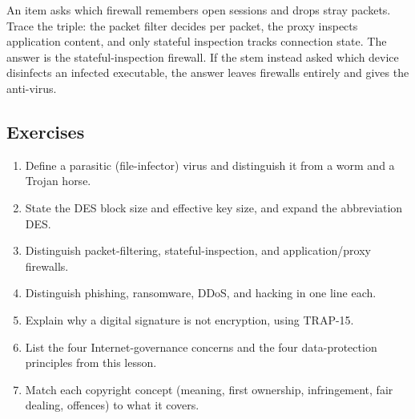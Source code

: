 \begin{example}
An item asks which firewall remembers open sessions and drops stray packets.
Trace the triple: the packet filter decides per packet, the proxy inspects
application content, and only stateful inspection tracks connection state.
The answer is the stateful-inspection firewall. If the stem instead asked
which device disinfects an infected executable, the answer leaves firewalls
entirely and gives the anti-virus.
\end{example}

\subsection*{Exercises}
\begin{enumerate}[label=\arabic*.]
  \item Define a parasitic (file-infector) virus and distinguish it from a worm and a Trojan horse.
  \item State the DES block size and effective key size, and expand the abbreviation DES.
  \item Distinguish packet-filtering, stateful-inspection, and application/proxy firewalls.
  \item Distinguish phishing, ransomware, DDoS, and hacking in one line each.
  \item Explain why a digital signature is not encryption, using TRAP-15.
  \item List the four Internet-governance concerns and the four data-protection principles from this lesson.
  \item Match each copyright concept (meaning, first ownership, infringement, fair dealing, offences) to what it covers.
\end{enumerate}

